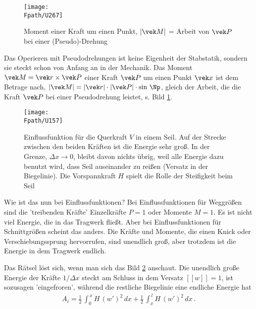 {{{{%
\begin{figure}[tbp]
\centering
\if {} \sidecaption \fi
\texttt{[image: \\Fpath/U267]}
\caption{Moment einer Kraft um einen Punkt, $|\vek M|$ = Arbeit von $\vek P$ bei einer (Pseudo)-Drehung} \label{U267}
%
\end{figure}%

\begin{remark}
Das Operieren mit Pseudodrehungen ist keine Eigenheit der Stabstatik, sondern sie steckt schon von Anfang an in der Mechanik. Das Moment $\vek M = \vek r \times \vek P$ einer Kraft $\vek P$ um einen Punkt $\vek x$ ist dem Betrage nach, $
|\vek M| =  | \vek r | \cdot | \vek P| \cdot \sin\,\Np
$,
gleich der Arbeit, die die Kraft $\vek P$ bei einer Pseudodrehung leistet, s. Bild \ref{U267}.
\end{remark}

\begin{figure}
\centering
{\texttt{[image: \\Fpath/U157]}}
\caption{Einflussfunktion f\"{u}r die Querkraft $V$ in einem Seil. Auf der Strecke zwischen den beiden Kr\"{a}ften ist die Energie sehr gro{\ss}. In der Grenze, $\Delta x \to 0$, bleibt davon nichts \"{u}brig, weil alle Energie dazu benutzt wird, dass Seil auseinander zu rei{\ss}en (Versatz in der Biegelinie). Die Vorspannkraft $H$ spielt die Rolle der Steifigkeit beim Seil }
\label{U157}%
%
\end{figure}%

Wie ist das nun bei Einflussfunktionen? Bei Einflussfunktionen f\"{u}r Weggr\"{o}{\ss}en sind die 'treibenden Kr\"{a}fte' Einzelkr\"{a}fte $P = 1$ oder Momente $M = 1$. Es ist nicht viel Energie, die in das Tragwerk flie{\ss}t. Aber bei Einflussfunktionen f\"{u}r Schnittgr\"{o}{\ss}en scheint das anders. Die Kr\"{a}fte und Momente, die einen Knick oder Verschiebungssprung hervorrufen, sind unendlich gro{\ss}, aber trotzdem ist die Energie in dem Tragwerk endlich.

Das R\"{a}tsel l\"{o}st sich, wenn man sich das Bild \ref{U157} anschaut. Die unendlich gro{\ss}e Energie der Kr\"{a}fte $1/\Delta x$ steckt am Schluss in dem Versatz $[[w]] = 1$, ist sozusagen 'eingefroren', w\"{a}hrend die restliche Biegelinie eine endliche Energie hat
\begin{align}
A_i = \frac{1}{2}\,\int_0^{\,x} H\,(w')^2\,dx + \frac{1}{2}\,\int_x^{\,l} H\,(w')^2\,dx\,.
\end{align}

}}}}
